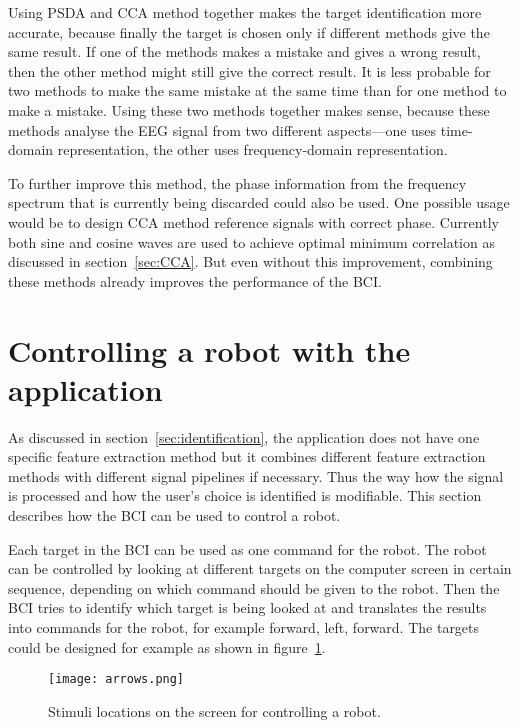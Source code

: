 Using \gls{PSDA} and \gls{CCA} method together makes the \gls{target} identification more accurate, because finally the \gls{target} is chosen only if different methods give the same result. If one of the methods makes a mistake and gives a wrong result, then the other method might still give the correct result. It is less probable for two methods to make the same mistake at the same time than for one method to make a mistake. Using these two methods together makes sense, because these methods analyse the \gls{EEG} signal from two different aspects---one uses time-domain representation, the other uses frequency-domain representation.

To further improve this method, the phase information from the \gls{frequency spectrum} that is currently being discarded could also be used. One possible usage would be to design \gls{CCA} method \glspl{reference signal} with correct phase. Currently both sine and cosine waves are used to achieve optimal minimum correlation as discussed in section~\ref{sec:CCA}. But even without this improvement, combining these methods already improves the performance of the \gls{BCI}.

\section{Controlling a robot with the application}

As discussed in section~\ref{sec:identification}, the application does not have one specific \gls{feature extraction} method but it combines different \gls{feature extraction} methods with different signal pipelines if necessary. Thus the way how the signal is processed and how the user's choice is identified is modifiable. This section describes how the \gls{BCI} can be used to control a robot.

Each \gls{target} in the \gls{BCI} can be used as one command for the robot. The robot can be controlled by looking at different \glspl{target} on the computer screen in certain sequence, depending on which command should be given to the robot. Then the \gls{BCI} tries to identify which \gls{target} is being looked at and translates the results into commands for the robot, for example forward, left, forward. The \glspl{target} could be designed for example as shown in figure~\ref{fig:arrow_stimuli}.

\begin{figure}[h]
	\centering
	\texttt{[image: arrows.png]}
	\caption{Stimuli locations on the screen for controlling a robot.}
	\label{fig:arrow_stimuli}
\end{figure}

